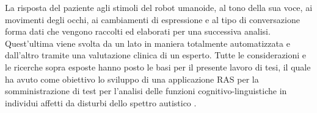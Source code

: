 \begin{sloppypar}
{La risposta del paziente agli stimoli del robot umanoide, al tono della sua voce, ai movimenti degli occhi, ai cambiamenti di espressione e al tipo di conversazione forma dati che vengono raccolti ed elaborati per una successiva analisi. Quest'ultima viene svolta da un lato in maniera totalmente automatizzata e dall'altro tramite una valutazione clinica di un esperto.\newline
Tutte le considerazioni e le ricerche sopra esposte hanno posto le basi per il presente lavoro di tesi, il quale ha avuto come obiettivo lo sviluppo di una applicazione RAS per la somministrazione di test per l’analisi delle funzioni cognitivo-linguistiche in individui affetti da disturbi dello spettro autistico \cite{Numero11}.
}
 \end{sloppypar}
 \afterpage{\blankpage}
